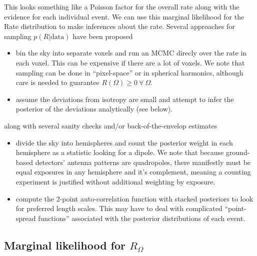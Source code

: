 \documentclass{article}
\begin{document}
This looks something like a Poisson factor for the overall rate along with the evidence for each individual event.
We can use this marginal likelihood for the Rate distribution to make inferences about the rate.
Several approaches for sampling $p(R|\mathrm{data})$ have been proposed
\begin{itemize}
    \item bin the sky into separate voxels and run an MCMC direcly over the rate in each voxel. This can be expensive if there are a lot of voxels. We note that sampling can be done in ``pixel-space'' or in spherical harmonics, although care is needed to guarantee $R(\Omega) \geq 0\ \forall\ \Omega$.
    \item assume the deviations from isotropy are small and attempt to infer the posterior of the deviations analytically (see below).
\end{itemize}
along with several sanity checks and/or back-of-the-envelop estimates
\begin{itemize}
    \item divide the sky into hemispheres and count the posterior weight in each hemisphere as a statistic looking for a dipole. We note that because ground-based detectors' antenna patterns are quadropoles, there manifestly must be equal exposures in any hemisphere and it's complement, meaning a counting experiment is justified without additional weighting by exposure.
    \item compute the 2-point auto-correlation function with stacked posteriors to look for preferred length scales. This may have to deal with complicated ``point-spread functions'' associated with the posterior distributions of each event.
\end{itemize}


\subsection*{Marginal likelihood for $R_\Omega$}
\end{document}
